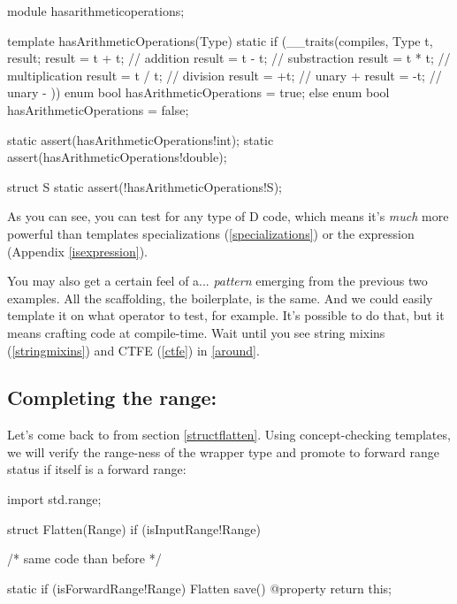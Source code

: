 \begin{dcode}
module hasarithmeticoperations;

template hasArithmeticOperations(Type)
{
    static if (__traits(compiles, 
                       {   
                           Type t, result;
                           result = t + t; // addition
                           result = t - t; // substraction
                           result = t * t; // multiplication
                           result = t / t; // division
                           result = +t;    // unary +
                           result = -t;    // unary -
                       }))
        enum bool hasArithmeticOperations = true;
    else
        enum bool hasArithmeticOperations = false;
}

static assert(hasArithmeticOperations!int);
static assert(hasArithmeticOperations!double);

struct S {}
static assert(!hasArithmeticOperations!S);
\end{dcode}

As you can see, you can test for any type of D code, which means it's \emph{much} more powerful than templates specializations (\ref{specializations}) or the  expression (Appendix \ref{isexpression}).

You may also get a certain feel of a... \emph{pattern} emerging from the previous two examples. All the scaffolding, the boilerplate, is the same. And we could easily template it on what operator to test, for example. It's possible to do that, but it means crafting code at compile-time. Wait until you see string mixins (\ref{stringmixins}) and CTFE (\ref{ctfe}) in \autoref{around}.

\subsection{Completing the  range:} 

Let's come back to  from section \ref{structflatten}. Using concept-checking templates, we will verify the range-ness of the wrapper type and promote  to forward range status if  itself is a forward range:

\begin{dcode}
import std.range;

struct Flatten(Range) if (isInputRange!Range)
{
    /* same code than before */

    static if (isForwardRange!Range)
        Flatten save() @property
        {
           return this;
        }
}
\end{dcode}

